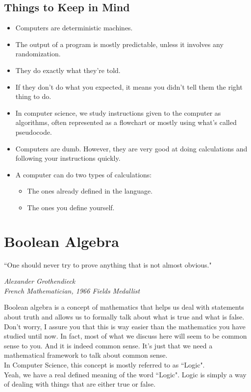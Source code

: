 \documentclass[letterpaper, 12pt]{book}
\begin{document}
\section{Things to Keep in Mind}
\begin{itemize}
	\item Computers are deterministic machines.
	\item The output of a program is mostly predictable, unless it involves any randomization.
	\item They do exactly what they're told.
	\item If they don't do what you expected, it means you didn't tell them the right thing to do.
	\item In computer science, we study instructions given to the computer as algorithms, often represented as a flowchart or mostly using what's called pseudocode.
	\item Computers are dumb. However, they are very good at doing calculations and following your instructions quickly.
	\item A computer can do two types of calculations:
	\begin{itemize}
		\item The ones already defined in the language.
		\item The ones you define yourself.
	\end{itemize}
\end{itemize}
\chapter{Boolean Algebra}
\epigraph{\centering ``One should never try to prove anything that is not almost obvious."}{\textit{Alexander Grothendieck \\ French Mathematician, 1966 Fields Medallist}}
Boolean algebra is a concept of mathematics that helps us deal with statements about truth and allows us to formally talk about what is true and what is false.\\
Don't worry, I assure you that this is way easier than the mathematics you have studied until now. In fact, most of what we discuss here will seem to be common sense to you. And it is indeed common sense. It's just that we need a mathematical framework to talk about common sense.\\
In Computer Science, this concept is mostly referred to as ``Logic".\\
Yeah, we have a real defined meaning of the word ``Logic". Logic is simply a way of dealing with things that are either true or false.\\
\end{document}
